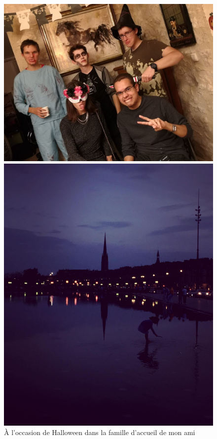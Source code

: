 \documentclass[a4paper,12pt]{article}
\begin{document}
\begin{figure}[htbp]
	\centering
	\begin{minipage}{0.3\textwidth}
		\centering
		\includegraphics[width=\linewidth]{4}
		\caption{À l'occasion de Halloween dans la famille d'accueil de mon ami}
		\label{fig:image1}
	\end{minipage}
	\hfill
	\begin{minipage}{0.3\textwidth}
		\centering
		\includegraphics[width=\linewidth]{43}

\end{minipage}
\end{figure}
\end{document}
